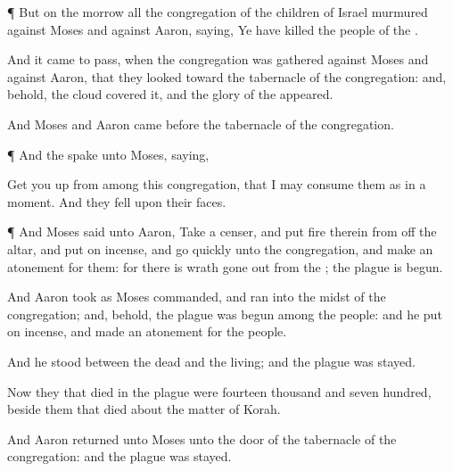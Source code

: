 {\par }{\PP {}¶ But on the
morrow all the
congregation of the
children of
Israel
murmured against
Moses and against
Aaron,
saying, Ye have
killed the
people of the
{}.

And it came to pass, when the
congregation was
gathered against
Moses and against
Aaron, that they
looked toward the
tabernacle of the
congregation: and, behold, the
cloud
covered it, and the
glory of the
{}
appeared.

And
Moses and
Aaron
came
before the
tabernacle of the
congregation.


\par }{\PP {}¶ And the
{}
spake unto
Moses,
saying,

Get you
up from
among this
congregation, that I may
consume them as in a
moment. And they
fell upon their
faces.


\par }{\PP {}¶ And
Moses
said unto
Aaron,
Take a
censer, and
put
fire therein from
off the
altar, and
put on
incense, and
go
quickly unto the
congregation, and make an
atonement for them: for there is
wrath gone
out from the
{}; the
plague is
begun.

And
Aaron
took as
Moses
commanded, and
ran into the
midst of the
congregation; and, behold, the
plague was
begun among the
people: and he
put on
incense, and made an
atonement for the
people.

And he
stood between the
dead and the
living; and the
plague was
stayed.

Now they that
died in the
plague were
fourteen
thousand and
seven
hundred, beside them that
died about the
matter of
Korah.

And
Aaron
returned unto
Moses unto the
door of the
tabernacle of the
congregation: and the
plague was
stayed.




\par }

